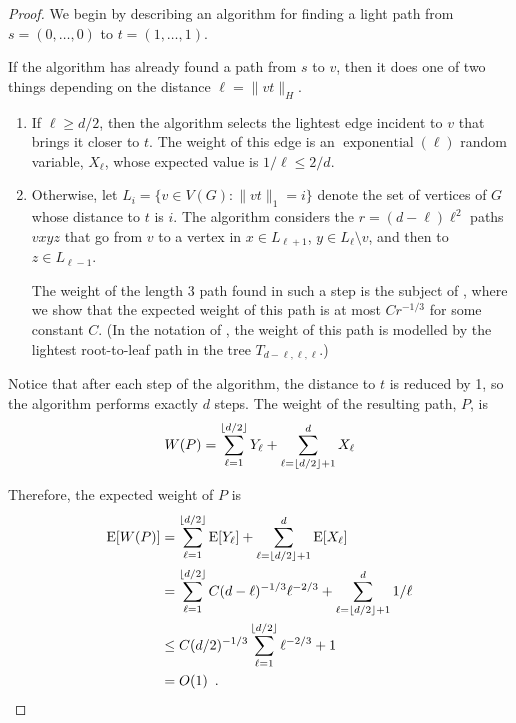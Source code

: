 \documentclass{patmorin}
\DeclareMathOperator{\exponential}{exponential}
\begin{document}
\begin{proof}
  We begin by describing an algorithm for finding a light path from
  $s=(0,\ldots,0)$ to $t=(1,\ldots,1)$.  

  If the algorithm has already found a path from $s$
  to $v$, then it does one of two things depending on the distance
  $\ell=\|vt\|_H$.
  \begin{enumerate}
     \item If $\ell \ge d/2$, then the algorithm selects the lightest
     edge incident to $v$ that brings it closer to $t$. The weight of
     this edge is an $\exponential(\ell)$ random variable, $X_\ell$,
     whose expected value is $1/\ell\le 2/d$.

   \item Otherwise, let $L_i = \{ v\in V(G) : \|vt\|_1=i\}$ denote the
    set of vertices of $G$ whose distance to $t$ is $i$.  The algorithm
    considers the $r=(d-\ell)\ell^2$ paths $vxyz$ that go from $v$ to
    a vertex in $x\in L_{\ell+1}$, $y\in L_{\ell}\setminus v$, and then
    to $z\in L_{\ell-1}$.  

    The weight of the length 3 path found in such a step is the subject
    of , where we show that the expected weight of this
    path is at most $Cr^{-1/3}$ for some constant $C$. (In the notation
    of , the weight of this path is modelled by the
    lightest root-to-leaf path in the tree $T_{d-\ell,\ell,\ell}$.)
  \end{enumerate}
  Notice that after each step of the algorithm, the distance to $t$ is
  reduced by 1, so the algorithm performs exactly $d$ steps.  The weight
  of the resulting path, $P$, is
  \begin{equation}
     W(P)  = \sum_{\ell=1}^{\lfloor d/2\rfloor} Y_\ell +
              \sum_{\ell=\lfloor d/2\rfloor+1}^d X_\ell
     \eqlabel{foxtrot-weight}
  \end{equation}
  
  Therefore, the expected weight of $P$ is 
  \begin{align*}
      \mathrm{E}[W(P)] & = \sum_{\ell=1}^{\lfloor d/2\rfloor} \mathrm{E}[Y_\ell] +
              \sum_{\ell=\lfloor d/2\rfloor+1}^d \mathrm{E}[X_\ell] \\
    & = \sum_{\ell=1}^{\lfloor d/2\rfloor} C(d-\ell)^{-1/3}\ell^{-2/3} +
     \sum_{\ell=\lfloor d/2\rfloor+1}^d 1/\ell \\
     & \le
     C(d/2)^{-1/3}\sum_{\ell=1}^{\lfloor d/2\rfloor} \ell^{-2/3} + 1 \\
     & = O(1) \enspace .
  \end{align*}


\end{proof}
\end{document}
